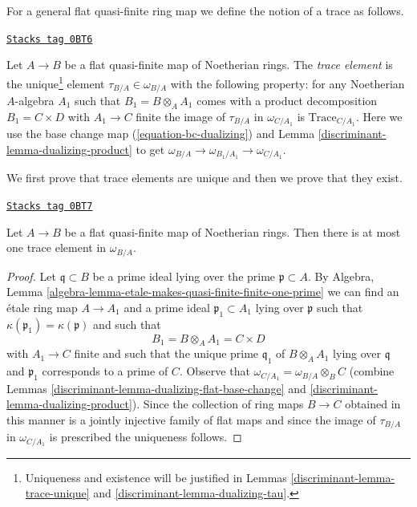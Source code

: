 \medskip\noindent
For a general flat quasi-finite ring map we define the notion
of a trace as follows.

\begin{definition}
\label{discriminant-definition-trace-element}
\href{https://stacks.math.columbia.edu/tag/0BT6}{\texttt{Stacks tag 0BT6}}

Let $A \to B$ be a flat quasi-finite map of Noetherian rings.
The {\it trace element} is the unique\footnote{Uniqueness
and existence will be justified in
Lemmas \ref{discriminant-lemma-trace-unique} and \ref{discriminant-lemma-dualizing-tau}.}
element
$\tau_{B/A} \in \omega_{B/A}$
with the following property: for any Noetherian $A$-algebra $A_1$
such that $B_1 = B \otimes_A A_1$ comes with a
product decomposition $B_1 = C \times D$ with $A_1 \to C$ finite
the image of $\tau_{B/A}$ in $\omega_{C/A_1}$
is $\text{Trace}_{C/A_1}$.
Here we use the base change map (\ref{equation-bc-dualizing}) and
Lemma \ref{discriminant-lemma-dualizing-product} to get
$\omega_{B/A} \to \omega_{B_1/A_1} \to \omega_{C/A_1}$.
\end{definition}

We first prove that trace elements are unique and then
we prove that they exist.

\begin{lemma}
\label{discriminant-lemma-trace-unique}
\href{https://stacks.math.columbia.edu/tag/0BT7}{\texttt{Stacks tag 0BT7}}

Let $A \to B$ be a flat quasi-finite map of Noetherian rings.
Then there is at most one trace element in $\omega_{B/A}$.
\end{lemma}

\begin{proof}

Let $\mathfrak q \subset B$ be a prime ideal lying over the prime
$\mathfrak p \subset A$. By
Algebra, Lemma \ref{algebra-lemma-etale-makes-quasi-finite-finite-one-prime}
we can find an \'etale ring map $A \to A_1$ and a prime
ideal $\mathfrak p_1 \subset A_1$ lying over $\mathfrak p$
such that $\kappa(\mathfrak p_1) = \kappa(\mathfrak p)$ and
such that
$$
B_1 = B \otimes_A A_1 = C \times D
$$
with $A_1 \to C$ finite and such that the unique prime $\mathfrak q_1$
of $B \otimes_A A_1$ lying over $\mathfrak q$ and $\mathfrak p_1$
corresponds to a prime of $C$. Observe that
$\omega_{C/A_1} = \omega_{B/A} \otimes_B C$
(combine Lemmas \ref{discriminant-lemma-dualizing-flat-base-change} and
\ref{discriminant-lemma-dualizing-product}). Since the collection
of ring maps $B \to C$ obtained in this manner is a jointly
injective family of flat maps and since the image of $\tau_{B/A}$
in $\omega_{C/A_1}$ is prescribed the uniqueness follows.
\end{proof}

